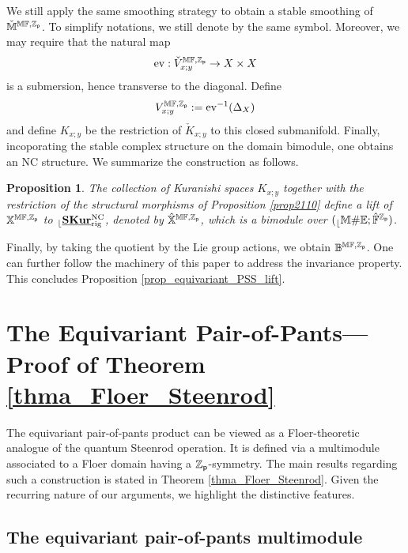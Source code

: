 \documentclass[reqno, 10pt]{amsart}
\numberwithin{equation}{section}
\numberwithin{equation}{section}
\newtheorem{prop}[thm]{Proposition}
\theoremstyle{definition}
\theoremstyle{remark}
\newcommand{\beqn}{\begin{equation*}}
\newcommand{\eeqn}{\end{equation*}}
\newcommand{\mb}{\mathbb}
\newcommand{\zp}{{{\mb Z}_{\sf p}}}
\renewcommand{\outer}{{}_{\lfloor}}
\newcommand{\uds}[1]{\underline{\smash{#1}}}
\newcommand{\ev}{{\rm ev}}
\begin{document}
We still apply the same smoothing strategy to obtain a stable smoothing of $\check {\mb M}^{\mb{MF}, \zp}$. To simplify notations, we still denote by the same symbol. Moreover, we may require that the natural map 
\beqn
\ev: \check V_{x; y}^{\mb{MF}, \zp} \to X \times X
\eeqn
is a submersion, hence transverse to the diagonal. Define
\beqn
V_{x;y}^{\mb{MF}, \zp}:= \ev^{-1}(\Delta_X)
\eeqn
and define $K_{x;y}$ be the restriction of $\check K_{x;y}$ to this closed submanifold. Finally, incoporating the stable complex structure on the domain bimodule, one obtains an NC structure. We summarize the construction as follows.

\begin{prop}
The collection of Kuranishi spaces $K_{x;y}$ together with the restriction of the structural morphisms of Proposition \ref{prop2110} define a lift of $\mb{X}^{\mb{MF}, \zp}$ to $\outer \uds{\bf SKur}_{\rm rig}^{\rm NC}$, denoted by $\hat{\mb X}^{\mb{MF}, \zp}$, which is a bimodule over $(\outer {\mb M}\# {\mb E}; \hat {\mb F}^\zp)$. 
\end{prop}

Finally, by taking the quotient by the Lie group actions, we obtain ${\mb B}^{\mb{MF}, \zp}$. One can further follow the machinery of this paper to address the invariance property. This concludes Proposition \ref{prop_equivariant_PSS_lift}.














\section{The Equivariant Pair-of-Pants---Proof of Theorem \ref{thma_Floer_Steenrod}}\label{section_Floer_Steenrod}

The equivariant pair-of-pants product can be viewed as a Floer-theoretic analogue of the quantum Steenrod operation. It is defined via a multimodule associated to a Floer domain having a $\zp$-symmetry. The main results regarding such a construction is stated in Theorem \ref{thma_Floer_Steenrod}. Given the recurring nature of our arguments, we highlight the distinctive features.

\subsection{The equivariant pair-of-pants multimodule}
\end{document}

